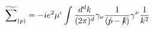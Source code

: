 \begin{equation}
\widetilde{\sum}_{(p)}=-ie^{2}\mu^{\epsilon}\int\frac{d^{d}k}{(2\pi)^{d}}
\gamma_{\nu}\frac{1}{(p\hspace{-0.2cm}/-k\hspace{-0.2cm}/)}\gamma^{\nu}\frac{1}{k^{2}}
\end{equation}


